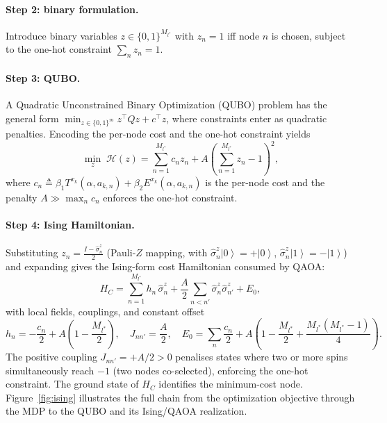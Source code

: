 \documentclass[11pt,a4paper]{article}
\theoremstyle{definition}
\newcommand{\ket}[1]{\left\lvert #1 \right\rangle}
\begin{document}
\paragraph{Step 2: binary formulation.}
Introduce binary variables $z \in \{0,1\}^{M_{l^*}}$ with $z_n = 1$ iff node $n$ is chosen, subject to the one-hot constraint $\sum_n z_n = 1$.

\paragraph{Step 3: QUBO.}
A Quadratic Unconstrained Binary Optimization (QUBO) problem has the general form $\min_{z\in\{0,1\}^m} z^\top Q z + c^\top z$, where constraints enter as quadratic penalties. Encoding the per-node cost and the one-hot constraint yields
\begin{equation}
  \min_{z} \;\mathcal{H}(z) = \sum_{n=1}^{M_{l^*}} c_n z_n + A\!\left(\sum_{n=1}^{M_{l^*}} z_n - 1\right)^{\!2},
  \label{eq:qubo}
\end{equation}
where $c_n \triangleq \beta_1 T^{x_k}(\alpha, a_{k,n}) + \beta_2 E^{x_k}(\alpha, a_{k,n})$ is the per-node cost and the penalty $A \gg \max_n c_n$ enforces the one-hot constraint.

\paragraph{Step 4: Ising Hamiltonian.}
Substituting $z_n = \tfrac{I - \hat{\sigma}_n^z}{2}$ (Pauli-$Z$ mapping, with $\hat{\sigma}_n^z\ket{0}=+\ket{0}$, $\hat{\sigma}_n^z\ket{1}=-\ket{1}$) and expanding gives the Ising-form cost Hamiltonian consumed by QAOA:
\begin{equation}
  H_C = \sum_{n=1}^{M_{l^*}} h_n\,\hat{\sigma}_n^z
        + \frac{A}{2}\!\sum_{n < n'}\!\hat{\sigma}_n^z\hat{\sigma}_{n'}^z + E_0,
  \label{eq:hamiltonian}
\end{equation}
with local fields, couplings, and constant offset
\begin{equation}
  h_n = -\frac{c_n}{2} + A\!\left(1 - \frac{M_{l^*}}{2}\right),
  \quad
  J_{nn'} = \frac{A}{2},
  \quad
  E_0 = \sum_n \frac{c_n}{2} + A\!\left(1 - \frac{M_{l^*}}{2} + \frac{M_{l^*}(M_{l^*}-1)}{4}\right).
  \label{eq:ising_coeffs}
\end{equation}
The positive coupling $J_{nn'} = +A/2 > 0$ penalises states where two or more spins simultaneously reach $-1$ (two nodes co-selected), enforcing the one-hot constraint. The ground state of $H_C$ identifies the minimum-cost node. Figure~\ref{fig:ising} illustrates the full chain from the optimization objective through the MDP to the QUBO and its Ising/QAOA realization.
\end{document}
